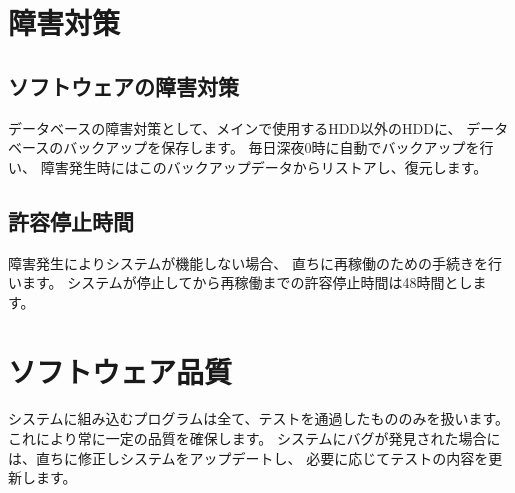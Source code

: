 \documentclass[a4j,titlepage]{jarticle}
\begin{document}
\section{障害対策}
\subsection{ソフトウェアの障害対策}
データベースの障害対策として、メインで使用するHDD以外のHDDに、
データベースのバックアップを保存します。
毎日深夜0時に自動でバックアップを行い、
障害発生時にはこのバックアップデータからリストアし、復元します。
\subsection{許容停止時間}
障害発生によりシステムが機能しない場合、
直ちに再稼働のための手続きを行います。
システムが停止してから再稼働までの許容停止時間は48時間とします。

\section{ソフトウェア品質}
システムに組み込むプログラムは全て、テストを通過したもののみを扱います。
これにより常に一定の品質を確保します。
システムにバグが発見された場合には、直ちに修正しシステムをアップデートし、
必要に応じてテストの内容を更新します。
\end{document}

